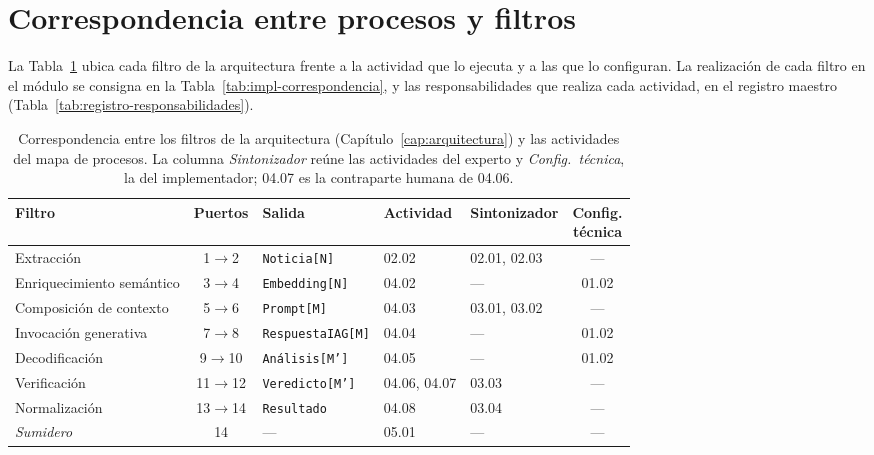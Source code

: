 \documentclass[12pt]{report}
\begin{document}
\section{Correspondencia entre procesos y filtros}
\label{sec:proc-correspondencia}

La Tabla~\ref{tab:proc-correspondencia} ubica cada filtro de la arquitectura frente a la actividad que lo ejecuta y a las que lo configuran. La realización de cada filtro en el módulo se consigna en la Tabla~\ref{tab:impl-correspondencia}, y las responsabilidades que realiza cada actividad, en el registro maestro (Tabla~\ref{tab:registro-responsabilidades}).

\begin{table}[H]
  \centering
  \footnotesize
  \setlength{\tabcolsep}{3pt}
  \caption{Correspondencia entre los filtros de la arquitectura (Capítulo~\ref{cap:arquitectura}) y las actividades del mapa de procesos. La columna \textit{Sintonizador} reúne las actividades del experto y \textit{Config.\ técnica}, la del implementador; 04.07 es la contraparte humana de 04.06.}
  \label{tab:proc-correspondencia}
  \begin{tabularx}{\textwidth}{@{}>{\raggedright\arraybackslash}X c l l l c@{}}
    \toprule
    \textbf{Filtro}           & \textbf{Puertos} & \textbf{Salida}          & \textbf{Actividad} & \textbf{Sintonizador} & \shortstack{\textbf{Config.} \\\textbf{técnica}} \\
    \midrule
    Extracción                & 1$\to$2          & \texttt{Noticia[N]}      & 02.02              & 02.01, 02.03          & ---                          \\
    Enriquecimiento semántico & 3$\to$4          & \texttt{Embedding[N]}    & 04.02              & ---                   & 01.02                        \\
    Composición de contexto   & 5$\to$6          & \texttt{Prompt[M]}       & 04.03              & 03.01, 03.02          & ---                          \\
    Invocación generativa     & 7$\to$8          & \texttt{RespuestaIAG[M]} & 04.04              & ---                   & 01.02                        \\
    Decodificación            & 9$\to$10         & \texttt{Análisis[M']}    & 04.05              & ---                   & 01.02                        \\
    Verificación              & 11$\to$12        & \texttt{Veredicto[M']}   & 04.06, 04.07       & 03.03                 & ---                          \\
    Normalización             & 13$\to$14        & \texttt{Resultado}       & 04.08              & 03.04                 & ---                          \\
    \midrule
    \textit{Sumidero}         & 14               & ---                      & 05.01              & ---                   & ---                          \\
    \bottomrule
  \end{tabularx}
\end{table}
\end{document}
